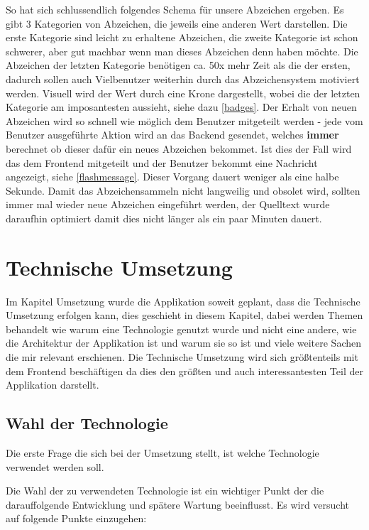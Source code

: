 \documentclass[12pt,twoside]{book}
\begin{document}
So hat sich schlussendlich folgendes Schema für unsere Abzeichen ergeben. Es gibt 3 Kategorien von Abzeichen, die jeweils eine anderen Wert darstellen. Die erste Kategorie sind leicht zu erhaltene Abzeichen, die zweite Kategorie ist schon schwerer, aber gut machbar wenn man dieses Abzeichen denn haben möchte. Die Abzeichen der letzten Kategorie benötigen ca. 50x mehr Zeit als die der ersten, dadurch sollen auch Vielbenutzer weiterhin durch das Abzeichensystem motiviert werden. Visuell wird der Wert durch eine Krone dargestellt, wobei die der letzten Kategorie am imposantesten aussieht, siehe dazu \ref{badges}.
Der Erhalt von neuen Abzeichen wird so schnell wie möglich dem Benutzer mitgeteilt werden - jede vom Benutzer ausgeführte Aktion wird an das Backend gesendet, welches \textbf{immer} berechnet ob dieser dafür ein neues Abzeichen bekommet. Ist dies der Fall wird das dem Frontend mitgeteilt und der Benutzer bekommt eine Nachricht angezeigt, siehe \ref{flashmessage}. Dieser Vorgang dauert weniger als eine halbe Sekunde.
Damit das Abzeichensammeln nicht langweilig und obsolet wird, sollten immer mal wieder neue Abzeichen eingeführt werden, der Quelltext wurde daraufhin optimiert damit dies nicht länger als ein paar Minuten dauert.


\chapter{Technische Umsetzung}

Im Kapitel Umsetzung wurde die Applikation soweit geplant, dass die Technische Umsetzung erfolgen kann, dies geschieht in diesem Kapitel, dabei werden Themen behandelt wie warum eine Technologie genutzt wurde und nicht eine andere, wie die Architektur der Applikation ist und warum sie so ist und viele weitere Sachen die mir relevant erschienen.
Die Technische Umsetzung wird sich größtenteils mit dem Frontend beschäftigen da dies den größten und auch interessantesten Teil der Applikation darstellt.


\section{Wahl der Technologie}

Die erste Frage die sich bei der Umsetzung stellt, ist welche Technologie verwendet werden soll.

Die Wahl der zu verwendeten Technologie ist ein wichtiger Punkt der die darauffolgende Entwicklung und spätere Wartung beeinflusst. Es wird versucht auf folgende Punkte einzugehen:
\end{document}
